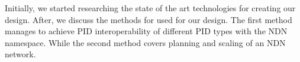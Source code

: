 

Initially, we started researching the state of the art technologies for creating our design. After, we discuss the methods for used for our design. The first method manages to achieve PID interoperability of different PID types with the NDN namespace. While the second method covers planning and scaling of an NDN network. 



